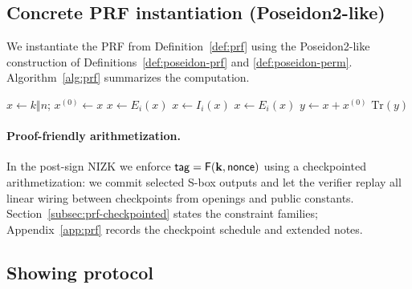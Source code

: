 \subsection{Concrete PRF instantiation (Poseidon2-like)}
\label{subsec:poseidon-prf}

\providecommand{\Tr}{\mathrm{Tr}}

We instantiate the PRF from Definition~\ref{def:prf} using the Poseidon2-like construction of
Definitions~\ref{def:poseidon-prf} and \ref{def:poseidon-perm}. Algorithm~\ref{alg:prf} summarizes the computation.

\begin{algorithm}[H]
\caption{$\PRF(k,n)$ (Poseidon2-like with feed-forward + truncation)}
\label{alg:prf}
\begin{algorithmic}[1]
\State $x \gets k\Vert n$; $x^{(0)}\gets x$
 \State $x\gets E_i(x)$ \EndFor
{} \State $x\gets I_i(x)$ \EndFor
{} \State $x\gets E_i(x)$ \EndFor
\State $y \gets x + x^{(0)}$ 
\State \Return $\Tr(y)$ 
\end{algorithmic}
\end{algorithm}

\paragraph{Proof-friendly arithmetization.}
In the post-sign NIZK we enforce $\mathsf{tag}=\mathsf{F}(\mathbf{k},\mathsf{nonce})$ using a checkpointed arithmetization: we commit
selected S-box outputs and let the verifier replay all linear wiring between checkpoints from openings and public
constants. Section~\ref{subsec:prf-checkpointed} states the constraint families; Appendix~\ref{app:prf} records the
checkpoint schedule and extended notes.

\subsection{Showing protocol}
\label{subsec:showing-protocol}
\label{subsec:arc-protocol}

